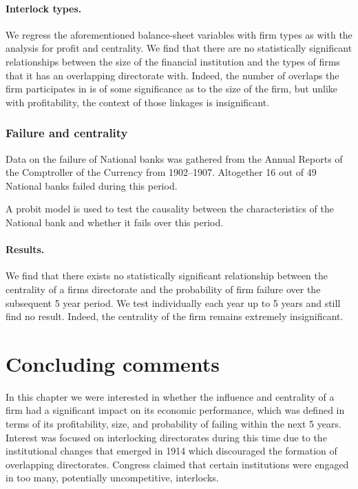 \paragraph{Interlock types.}

We regress the aforementioned balance-sheet variables with firm types as with the analysis for profit and centrality. We find that there are no statistically significant relationships between the size of the financial institution and the types of firms that it has an overlapping directorate with. Indeed, the number of overlaps the firm participates in is of some significance as to the size of the firm, but unlike with profitability, the context of those linkages is insignificant.

\subsubsection*{Failure and centrality}

Data on the failure of National banks was gathered from the Annual Reports of the Comptroller of the Currency from 1902--1907. Altogether 16 out of 49 National banks failed during this period.

A probit model is used to test the causality between the characteristics of the National bank and whether it fails over this period.

\paragraph{Results.} We find that there exists no statistically significant relationship between the centrality of a firms directorate and the probability of firm failure over the subsequent 5 year period. We test individually each year up to 5 years and still find no result. Indeed, the centrality of the firm remains extremely insignificant.

\section{Concluding comments}

In this chapter we were interested in whether the influence and centrality of a firm had a significant impact on its economic performance, which was defined in terms of its profitability, size, and probability of failing within the next 5 years. Interest was focused on interlocking directorates during this time due to the institutional changes that emerged in 1914 which discouraged the formation of overlapping directorates. Congress claimed that certain institutions were engaged in too many, potentially uncompetitive, interlocks.

